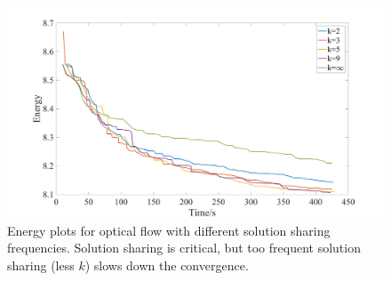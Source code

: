 \begin{figure}[tb]
  \includegraphics[width=\columnwidth]{figure/optical_flow_by_interval.png}
  \caption{Energy plots for optical flow with different solution sharing
  frequencies. Solution sharing is critical, but too frequent solution
  sharing (less $k$) slows down the convergence.}
 \label{fig:optical_flow_by_beta}\label{fig:optical_flow_by_interval}
\end{figure}

